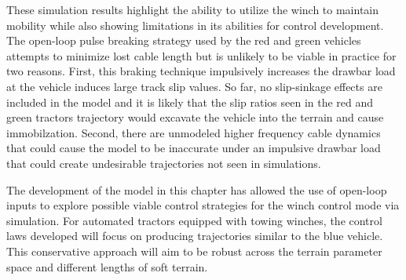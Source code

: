 These simulation results highlight the ability to utilize the winch to maintain mobility while also showing limitations in its abilities for control development. The open-loop pulse breaking strategy used by the red and green vehicles attempts to minimize lost cable length but is unlikely to be viable in practice for two reasons. First, this braking technique impulsively increases the drawbar load at the vehicle induces large track slip values. So far, no slip-sinkage effects are included in the model and it is likely that the slip ratios seen in the red and green tractors trajectory would excavate the vehicle into the terrain and cause immobilzation. Second, there are unmodeled higher frequency cable dynamics that could cause the model to be inaccurate under an impulsive drawbar load that could create undesirable trajectories not seen in simulations. 

The development of the model in this chapter has allowed the use of open-loop inputs to explore possible viable control strategies for the winch control mode via simulation. For automated tractors equipped with towing winches, the control laws developed will focus on producing trajectories similar to the blue vehicle. This conservative approach will aim to be robust across the terrain parameter space and different lengths of soft terrain.  


